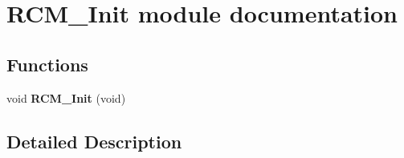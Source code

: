\hypertarget{group___r_c_m___init__module}{}\section{R\+C\+M\+\_\+\+Init module documentation}
\label{group___r_c_m___init__module}
\subsection*{Functions}
\begin{DoxyCompactItemize}
\item 
void {\bfseries R\+C\+M\+\_\+\+Init} (void)\hypertarget{group___r_c_m___init__module_ga0ca55568d8ce5e1d088e0f700573087a}{}\label{group___r_c_m___init__module_ga0ca55568d8ce5e1d088e0f700573087a}

\end{DoxyCompactItemize}


\subsection{Detailed Description}
